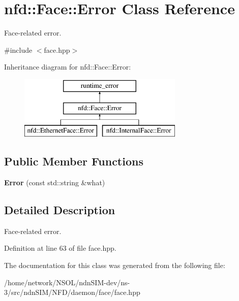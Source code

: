 \hypertarget{classnfd_1_1Face_1_1Error}{}\section{nfd\+:\+:Face\+:\+:Error Class Reference}
\label{classnfd_1_1Face_1_1Error}


Face-\/related error.  




{\ttfamily \#include $<$face.\+hpp$>$}

Inheritance diagram for nfd\+:\+:Face\+:\+:Error\+:\begin{figure}[H]
\begin{center}
\leavevmode
\includegraphics[height=3.000000cm]{classnfd_1_1Face_1_1Error}
\end{center}
\end{figure}
\subsection*{Public Member Functions}
\begin{DoxyCompactItemize}
\item 
{\bfseries Error} (const std\+::string \&what)\hypertarget{classnfd_1_1Face_1_1Error_a17258e89a1cd0ad41c8e51c7b1307a46}{}\label{classnfd_1_1Face_1_1Error_a17258e89a1cd0ad41c8e51c7b1307a46}

\end{DoxyCompactItemize}


\subsection{Detailed Description}
Face-\/related error. 

Definition at line 63 of file face.\+hpp.



The documentation for this class was generated from the following file\+:\begin{DoxyCompactItemize}
\item 
/home/network/\+N\+S\+O\+L/ndn\+S\+I\+M-\/dev/ns-\/3/src/ndn\+S\+I\+M/\+N\+F\+D/daemon/face/face.\+hpp\end{DoxyCompactItemize}
